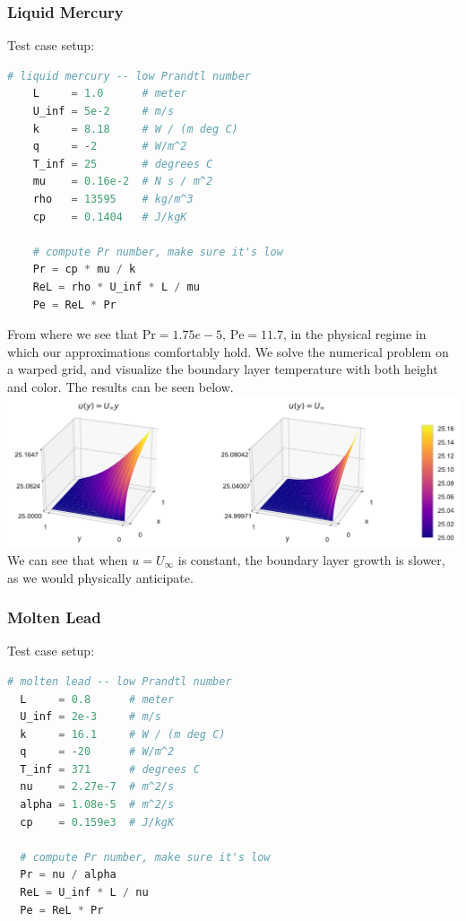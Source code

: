 \documentclass[10pt]{article}
\newcommand{\Pra}{\text{Pr}}
\newcommand{\Pe}{\text{Pe}}
\begin{document}
  \subsubsection{Liquid Mercury}
  Test case setup:

  \vspace{0.5cm}
  \begin{lstlisting}[language=Python]
    # liquid mercury -- low Prandtl number
    L     = 1.0      # meter
    U_inf = 5e-2     # m/s
    k     = 8.18     # W / (m deg C)
    q     = -2       # W/m^2
    T_inf = 25       # degrees C
    mu    = 0.16e-2  # N s / m^2
    rho   = 13595    # kg/m^3
    cp    = 0.1404   # J/kgK

    # compute Pr number, make sure it's low
    Pr = cp * mu / k
    ReL = rho * U_inf * L / mu
    Pe = ReL * Pr
  \end{lstlisting}
  \vspace{0.5cm}

  From where we see that $\Pra = 1.75e-5,\, \Pe = 11.7$, in the physical regime in which our
  approximations comfortably hold. We solve the numerical problem on a warped grid, and visualize
  the boundary layer temperature with both height and color. The results can be seen below.\\

  \includegraphics[width=\textwidth]{img/liquid_hg_BL.pdf}
  We can see that when $u = U_\infty$ is constant, the boundary layer growth is slower, as we would
  physically anticipate.

  \subsubsection{Molten Lead}
  Test case setup:

  \vspace{0.5cm}
  \begin{lstlisting}[language=Python]
  # molten lead -- low Prandtl number
  L     = 0.8      # meter
  U_inf = 2e-3     # m/s
  k     = 16.1     # W / (m deg C)
  q     = -20      # W/m^2
  T_inf = 371      # degrees C
  nu    = 2.27e-7  # m^2/s
  alpha = 1.08e-5  # m^2/s
  cp    = 0.159e3  # J/kgK

  # compute Pr number, make sure it's low
  Pr = nu / alpha
  ReL = U_inf * L / nu
  Pe = ReL * Pr
  \end{lstlisting}
  \vspace{1cm}
\end{document}
